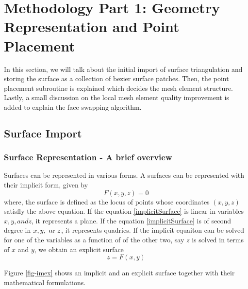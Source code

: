 \chapter{Methodology Part 1: Geometry Representation and Point Placement}

In this section, we will talk about the initial import of surface triangulation and storing the surface as a collection of bezier surface patches. Then, the point placement subroutine is explained which decides the mesh element structure. Lastly, a small discussion on the local mesh element quality improvement is added to explain the face swapping algorithm. 

\section{Surface Import}

\subsection{Surface Representation - A brief overview}

Surfaces can be represented in various forms. A surfaces can be represented with their implicit form, given by
\begin{equation}
F(x, y, z) = 0
\label{implicitSurface}
\end{equation}
where, the surface is defined as the locus of points whose coordinates $(x, y, z)$ satisfly the above equation. If the equation \ref{implicitSurface} is linear in variables $x, y, and z$, it represents a plane. If the equation \ref{implicitSurface} is of second degree in $x, y, \textnormal{ or } z$, it represents quadrics. If the implicit equaiton can be solved for one of the variables as a function of of the other two, say $z$ is solved in terms of $x$ and $y$, we obtain an explicit surface
\begin{equation}
z = F(x,y)
\end{equation}

Figure \ref{fig-imex} shows an implicit and an explicit surface together with their mathematical formulations.

